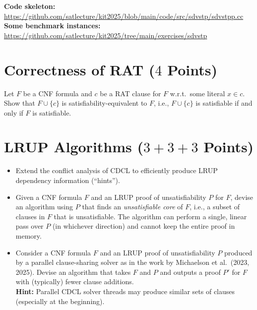 \documentclass[a4paper]{article}
\begin{document}
\vspace*{3mm}
\noindent
\textbf{Code skeleton:} \url{https://github.com/satlecture/kit2025/blob/main/code/src/sdvstp/sdvstpp.cc}
\\[1ex]
\noindent
\textbf{Some benchmark instances:} \url{https://github.com/satlecture/kit2025/tree/main/exercises/sdvstp}




\section{Correctness of RAT ($4$ Points)}
Let $F$ be a CNF formula and $c$ be a RAT clause for $F$ w.r.t.~some literal $x \in c$.
\\Show that $F \cup \{c\}$ is satisfiability-equivalent to $F$, i.e., $F \cup \{c\}$ is satisfiable if and only if $F$ is satisfiable.



\section{LRUP Algorithms ($3+3+3$ Points)}
\begin{itemize}
	\item[(a)] Extend the conflict analysis of CDCL to efficiently produce LRUP dependency information (``hints'').
	\item[(b)] Given a CNF formula $F$ and an LRUP proof of unsatisfiability $P$ for $F$, devise an algorithm using $P$ that finds an \emph{unsatisfiable core} of $F$, i.e., a subset of clauses in $F$ that is unsatisfiable.
	The algorithm can perform a single, linear pass over $P$ (in whichever direction) and cannot keep the entire proof in memory.
	\item[(c)] Consider a CNF formula $F$ and an LRUP proof of unsatisfiability $P$ produced by a parallel clause-sharing solver as in the work by Michaelson et al.~(2023, 2025).
	Devise an algorithm that takes $F$ and $P$ and outputs a proof $P'$ for $F$ with (typically) fewer clause additions.
	\\\textbf{Hint:} Parallel CDCL solver threads may produce similar sets of clauses (especially at the beginning).
\end{itemize}
\end{document}
